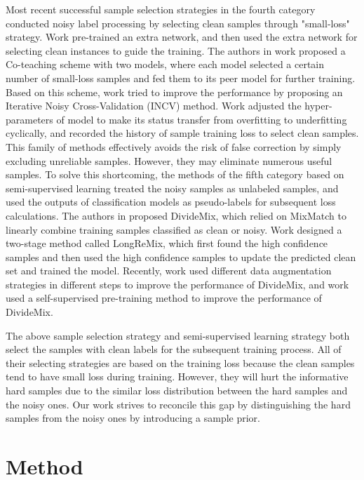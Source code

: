 \documentclass[letterpaper]{article} \usepackage{aaai22}  \usepackage{times}  \usepackage{helvet}  \usepackage{courier}  \usepackage[hyphens]{url}  \usepackage{graphicx} \urlstyle{rm} \def\UrlFont{\rm}  \usepackage{natbib}  \usepackage{caption} \DeclareCaptionStyle{ruled}{labelfont=normalfont,labelsep=colon,strut=off} \frenchspacing  \setlength{\pdfpagewidth}{8.5in}  \setlength{\pdfpageheight}{11in}  \usepackage{algorithm}
\begin{document}
Most recent successful sample selection strategies in the fourth category conducted noisy label processing by {selecting clean samples through "small-loss" strategy}. {Work \cite{jiang2018mentornet} pre-trained an extra network, and then used the extra network for selecting clean instances to guide the training.} The authors in work \cite{han2018co} proposed a Co-teaching scheme with two models, where each model selected a certain number of small-loss samples and fed them to its peer model for further training. Based on this scheme, work \cite{chen2019understanding} tried to improve the performance by proposing an Iterative Noisy Cross-Validation (INCV) method. {Work \cite{huang2019o2u} adjusted the hyper-parameters of model to make its status transfer from overfitting to underfitting cyclically, and recorded the history of sample training loss to select clean samples.} This family of methods effectively avoids the risk of false correction by simply excluding unreliable samples. However, they may eliminate numerous useful samples. To solve this shortcoming, the methods of the fifth category based on semi-supervised learning treated the noisy samples as unlabeled samples, and used the outputs of classification models as pseudo-labels for subsequent loss calculations. The authors in \cite{2020DivideMix} proposed DivideMix, which relied on MixMatch \cite{2019MixMatch} to linearly combine training samples classified as clean or noisy. Work \cite{2021LongReMix} designed a two-stage method called LongReMix, which first found the high confidence samples and then used the high confidence samples to update the predicted clean set and trained the model. Recently, work \cite{2021Augmentation} used different data augmentation strategies in different steps to improve the performance of DivideMix, {and work \cite{2022contrast} used a self-supervised pre-training method to improve the performance of DivideMix.}

The above sample selection strategy and semi-supervised learning strategy both select the samples with clean labels for the subsequent training process. All of their selecting strategies are based on the training loss because the clean samples tend to have small loss during training. However, they will hurt the informative hard samples due to the similar loss distribution between the hard samples and the noisy ones. Our work strives to reconcile this gap by distinguishing the hard samples from the noisy ones by introducing a sample prior.

\section{Method}
\end{document}
